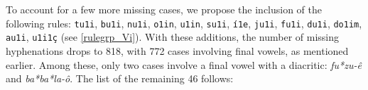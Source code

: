 To account for a few more missing cases, we propose the inclusion of the following rules: 
\texttt{tu1i}, \texttt{bu1i}, %
\texttt{nu1i}, %
\texttt{o1in}, \texttt{u1in}, \texttt{su1i}, \texttt{í1e}, %
\texttt{ju1i}, \texttt{fu1i}, \texttt{du1i}, \texttt{do1im}, \texttt{au1i}, \texttt{u1i1ç} (see \cref{rulegrp_Vi}).
With these additions, the number of missing hyphenations drops to 818, with 772 cases involving final vowels,
as mentioned earlier. Among these, only two cases involve a final vowel with a diacritic: \emph{fu*zu-ê} and \emph{ba*ba*la-ô}. %
The list of the remaining 46 follows:

